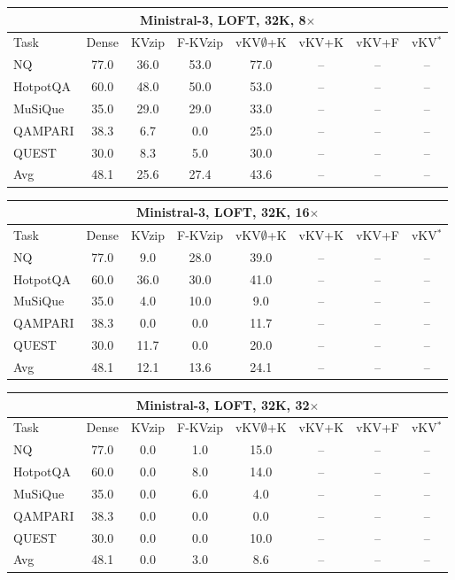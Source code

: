 \begin{tabular}{lccccccc}
\toprule
\multicolumn{8}{c}{Ministral-3, LOFT, 32K, 8$\times$} \\
\midrule
Task & Dense & KVzip & F-KVzip & vKV$\emptyset$+K & vKV+K & vKV+F & vKV$^\ast$ \\
\midrule
NQ & 77.0 & 36.0 & 53.0 & 77.0 & -- & -- & -- \\
HotpotQA & 60.0 & 48.0 & 50.0 & 53.0 & -- & -- & -- \\
MuSiQue & 35.0 & 29.0 & 29.0 & 33.0 & -- & -- & -- \\
QAMPARI & 38.3 & 6.7 & 0.0 & 25.0 & -- & -- & -- \\
QUEST & 30.0 & 8.3 & 5.0 & 30.0 & -- & -- & -- \\
\midrule
Avg & 48.1 & 25.6 & 27.4 & 43.6 & -- & -- & -- \\
\bottomrule
\end{tabular}
\vspace{0.8em}

\begin{tabular}{lccccccc}
\toprule
\multicolumn{8}{c}{Ministral-3, LOFT, 32K, 16$\times$} \\
\midrule
Task & Dense & KVzip & F-KVzip & vKV$\emptyset$+K & vKV+K & vKV+F & vKV$^\ast$ \\
\midrule
NQ & 77.0 & 9.0 & 28.0 & 39.0 & -- & -- & -- \\
HotpotQA & 60.0 & 36.0 & 30.0 & 41.0 & -- & -- & -- \\
MuSiQue & 35.0 & 4.0 & 10.0 & 9.0 & -- & -- & -- \\
QAMPARI & 38.3 & 0.0 & 0.0 & 11.7 & -- & -- & -- \\
QUEST & 30.0 & 11.7 & 0.0 & 20.0 & -- & -- & -- \\
\midrule
Avg & 48.1 & 12.1 & 13.6 & 24.1 & -- & -- & -- \\
\bottomrule
\end{tabular}
\vspace{0.8em}

\begin{tabular}{lccccccc}
\toprule
\multicolumn{8}{c}{Ministral-3, LOFT, 32K, 32$\times$} \\
\midrule
Task & Dense & KVzip & F-KVzip & vKV$\emptyset$+K & vKV+K & vKV+F & vKV$^\ast$ \\
\midrule
NQ & 77.0 & 0.0 & 1.0 & 15.0 & -- & -- & -- \\
HotpotQA & 60.0 & 0.0 & 8.0 & 14.0 & -- & -- & -- \\
MuSiQue & 35.0 & 0.0 & 6.0 & 4.0 & -- & -- & -- \\
QAMPARI & 38.3 & 0.0 & 0.0 & 0.0 & -- & -- & -- \\
QUEST & 30.0 & 0.0 & 0.0 & 10.0 & -- & -- & -- \\
\midrule
Avg & 48.1 & 0.0 & 3.0 & 8.6 & -- & -- & -- \\
\bottomrule
\end{tabular}
\vspace{0.8em}

